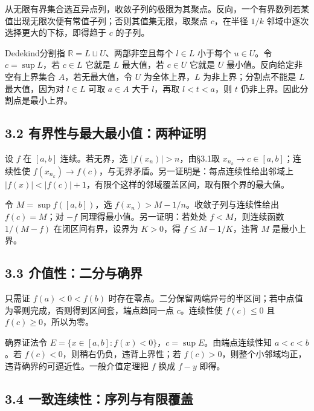 \documentclass[11pt,a4paper]{article}
\begin{document}
从无限有界集合选互异点列，收敛子列的极限为其聚点。反向，一个有界数列若某值出现无限次便有常值子列；否则其值集无限，取聚点
\(c\)，在半径 \(1/k\) 邻域中逐次选择更大的下标，即得趋于 \(c\) 的子列。

Dedekind分割指 \(\mathbb R=L\sqcup U\)、两部非空且每个 \(l\in L\)
小于每个 \(u\in U\)。令 \(c=\sup L\)，若 \(c\in L\) 它就是 \(L\)
最大值，若 \(c\in U\) 它就是 \(U\) 最小值。反向给定非空有上界集合
\(A\)，若无最大值，令 \(U\) 为全体上界，\(L\) 为非上界；分割点不能是
\(L\) 最大值，因为对 \(l\in L\) 可取 \(a\in A\) 大于 \(l\)，再取
\(l<t<a\)，则 \(t\) 仍非上界。因此分割点是最小上界。

\subsection{3.2
有界性与最大最小值：两种证明}\label{ux6709ux754cux6027ux4e0eux6700ux5927ux6700ux5c0fux503cux4e24ux79cdux8bc1ux660e}

设 \(f\) 在 \([a,b]\) 连续。若无界，选 \(|f(x_n)|>n\)，由§3.1取
\(x_{n_k}\to c\in[a,b]\)；连续性使
\(f(x_{n_k})\to f(c)\)，与无界矛盾。另一证明是：每点连续性给出邻域上
\(|f(x)|<|f(c)|+1\)，有限个这样的邻域覆盖区间，取有限个界的最大值。

令 \(M=\sup f([a,b])\)，选 \(f(x_n)>M-1/n\)。收敛子列与连续性给出
\(f(c)=M\)；对 \(-f\) 同理得最小值。另一证明：若处处 \(f<M\)，则连续函数
\(1/(M-f)\) 在闭区间有界，设界为 \(K>0\)，得 \(f\le M-1/K\)，违背 \(M\)
是最小上界。

\subsection{3.3
介值性：二分与确界}\label{ux4ecbux503cux6027ux4e8cux5206ux4e0eux786eux754c}

只需证 \(f(a)<0<f(b)\)
时存在零点。二分保留两端异号的半区间；若中点值为零则完成，否则得到区间套，端点趋同一点
\(c\)。连续性使 \(f(c)\le0\) 且 \(f(c)\ge0\)，所以为零。

确界证法令 \(E=\{x\in[a,b]:f(x)<0\}\)，\(c=\sup E\)。由端点连续性知
\(a<c<b\)。若 \(f(c)<0\)，则稍右仍负，违背上界性；若
\(f(c)>0\)，则整个小邻域均正，违背确界的可逼近性。一般介值定理把 \(f\)
换成 \(f-y\) 即得。

\subsection{3.4
一致连续性：序列与有限覆盖}\label{ux4e00ux81f4ux8fdeux7eedux6027ux5e8fux5217ux4e0eux6709ux9650ux8986ux76d6}
\end{document}
